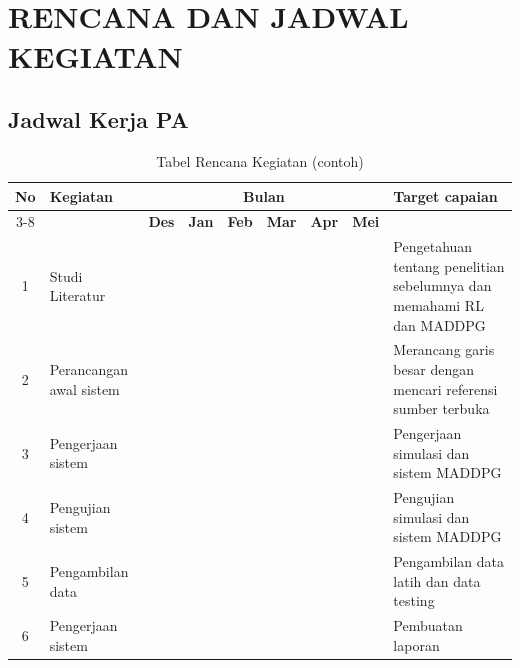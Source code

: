 \chapter[RENCANA DAN JADWAL KEGIATAN]{\\ RENCANA DAN JADWAL KEGIATAN}

\section{Jadwal Kerja PA}
\lipsum[2][4]

\begin{table}[h!]
    \centering
    \caption{Tabel Rencana Kegiatan (contoh)}
    \label{t-rencana-kegiatan}
    \begin{tabular}{|c|p{2.5cm}|c|c|c|c|c|c|p{3.5cm}|}
        \hline
        \multirow{2}{*}{\textbf{No}} 
        & \multirow{2}{*}{\textbf{Kegiatan}} 
        & \multicolumn{6}{c|}{\textbf{Bulan}} 
        & \multirow{2}{*}{\textbf{Target capaian}} \\ 
        \cline{3-8}
        
        & & \textbf{Des} & \textbf{Jan} & \textbf{Feb} & \textbf{Mar} & \textbf{Apr} & \textbf{Mei} & \\ 
        \hline
        
        1 & Studi Literatur 
            & \cellcolor[HTML]{C0C0C0} & \cellcolor[HTML]{C0C0C0} & \cellcolor[HTML]{C0C0C0} 
            & & & & Pengetahuan tentang penelitian sebelumnya dan memahami RL dan MADDPG \\ \hline
            
        2 & Perancangan awal sistem 
            & & \cellcolor[HTML]{C0C0C0} & \cellcolor[HTML]{C0C0C0} 
            & & & & Merancang garis besar dengan mencari referensi sumber terbuka \\ \hline
            
        3 & Pengerjaan sistem 
            & & & \cellcolor[HTML]{C0C0C0} & \cellcolor[HTML]{C0C0C0} 
            & & & Pengerjaan simulasi dan sistem MADDPG \\ \hline
            
        4 & Pengujian sistem 
            & & & & \cellcolor[HTML]{C0C0C0} & \cellcolor[HTML]{C0C0C0} 
            & & Pengujian simulasi dan sistem MADDPG \\ \hline
            
        5 & Pengambilan data 
            & & & & \cellcolor[HTML]{C0C0C0} & \cellcolor[HTML]{C0C0C0} 
            & & Pengambilan data latih dan data testing \\ \hline
            
        6 & Pengerjaan sistem 
            & & & & & \cellcolor[HTML]{C0C0C0} & \cellcolor[HTML]{C0C0C0} 
            & Pembuatan laporan \\ \hline
    \end{tabular}
\end{table}
